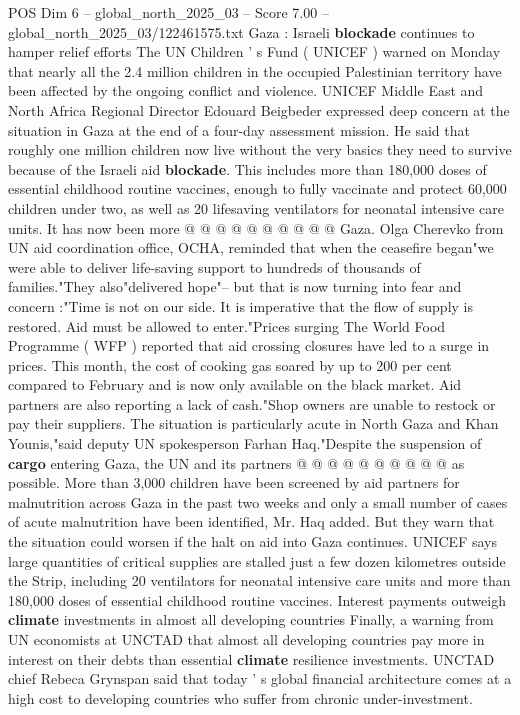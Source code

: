 \begin{textsample}{POS Dim 6 – global\_north\_2025\_03 – Score 7.00 – global\_north\_2025\_03/122461575.txt}
Gaza : Israeli \textbf{blockade} continues to hamper relief efforts The UN Children ' s Fund ( UNICEF ) warned on Monday that nearly all the 2.4 million children in the occupied Palestinian territory have been affected by the ongoing conflict and violence.
UNICEF Middle East and North Africa Regional Director Edouard Beigbeder expressed deep concern at the situation in Gaza at the end of a four-day assessment mission.
He said that roughly one million children now live without the very basics they need to survive because of the Israeli aid \textbf{blockade}.
This includes more than 180,000 doses of essential childhood routine vaccines, enough to fully vaccinate and protect 60,000 children under two, as well as 20 lifesaving ventilators for neonatal intensive care units.
It has now been more @ @ @ @ @ @ @ @ @ @ Gaza.
Olga Cherevko from UN aid coordination office, OCHA, reminded that when the ceasefire began"we were able to deliver life-saving support to hundreds of thousands of families."They also"delivered hope"-- but that is now turning into fear and concern :"Time is not on our side.
It is imperative that the flow of supply is restored.
Aid must be allowed to enter."Prices surging The World Food Programme ( WFP ) reported that aid crossing closures have led to a surge in prices.
This month, the cost of cooking gas soared by up to 200 per cent compared to February and is now only available on the black market.
Aid partners are also reporting a lack of cash."Shop owners are unable to restock or pay their suppliers.
The situation is particularly acute in North Gaza and Khan Younis,"said deputy UN spokesperson Farhan Haq."Despite the suspension of \textbf{cargo} entering Gaza, the UN and its partners @ @ @ @ @ @ @ @ @ @ as possible.
More than 3,000 children have been screened by aid partners for malnutrition across Gaza in the past two weeks and only a small number of cases of acute malnutrition have been identified, Mr.
Haq added.
But they warn that the situation could worsen if the halt on aid into Gaza continues.
UNICEF says large quantities of critical supplies are stalled just a few dozen kilometres outside the Strip, including 20 ventilators for neonatal intensive care units and more than 180,000 doses of essential childhood routine vaccines.
Interest payments outweigh \textbf{climate} investments in almost all developing countries Finally, a warning from UN economists at UNCTAD that almost all developing countries pay more in interest on their debts than essential \textbf{climate} resilience investments.
UNCTAD chief Rebeca Grynspan said that today ' s global financial architecture comes at a high cost to developing countries who suffer from chronic under-investment.

\end{textsample}

